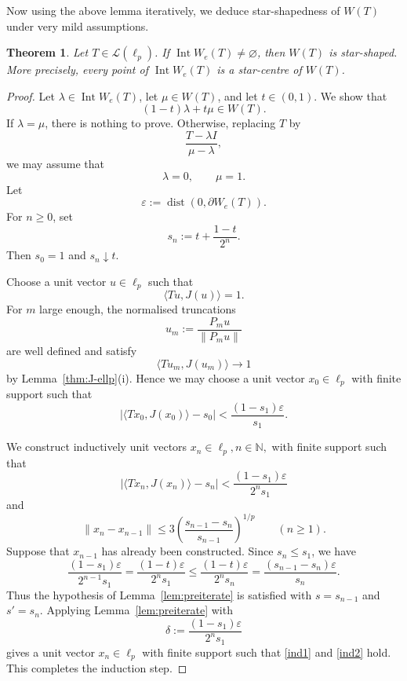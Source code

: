 \documentclass[11pt]{amsart}
\numberwithin{equation}{section}
\newtheorem{theorem}{Theorem}[section]
\theoremstyle{definition}
\theoremstyle{remark}
\DeclareMathOperator{\Int}{Int}
\newcommand{\We}{W_e}
\begin{document}
Now using the above lemma iteratively, we deduce star-shapedness of $W(T)$ under very mild assumptions. 



\begin{theorem}\label{thm:W-starshaped-when-intWe}
Let \(T\in\mathcal L(\ell_p)\). If $\Int \We(T)\ne \varnothing$, then $W(T)$ is star-shaped. More precisely, every point of $\Int \We(T)$ is a star-centre of $W(T)$.
\end{theorem}
\begin{proof}
Let \(\lambda\in \operatorname{Int}W_e(T)\), let \(\mu\in W(T)\), and let
\(t\in(0,1)\). We show that
\[
        (1-t)\lambda+t\mu\in W(T).
\]
If \(\lambda=\mu\), there is nothing to prove. Otherwise, replacing \(T\) by
\[
        \frac{T-\lambda I}{\mu-\lambda},
\]
we may assume that
\[
        \lambda=0,\qquad \mu=1.
\]
Let
\[
        \varepsilon:=\operatorname{dist}(0,\partial W_e(T)).
\]
For \(n\ge0\), set
\[
        s_n:=t+\frac{1-t}{2^n}.
\]
Then \(s_0=1\) and \(s_n\downarrow t\).

Choose a unit vector \(u\in\ell_p\) such that
\[
        \langle Tu,J(u)\rangle=1.
\]
For \(m\) large enough, the normalised truncations
\[
        u_m:=\frac{P_m u}{\|P_m u\|}
\]
are well defined and satisfy
\[
        \langle Tu_m,J(u_m)\rangle\to 1
\]
by Lemma~\ref{thm:J-ellp}(i). Hence we may choose a unit vector \(x_0\in\ell_p\) with
finite support such that
\[
        |\langle Tx_0,J(x_0)\rangle-s_0|
        <
        \frac{(1-s_1)\varepsilon}{s_1}.
\]

We construct inductively unit vectors \(x_n\in\ell_p, n \in \mathbb N,\) with finite support
such that
\begin{equation}\label{ind1}
        |\langle Tx_n,J(x_n)\rangle-s_n|
        <
        \frac{(1-s_1)\varepsilon}{2^n s_1}
\end{equation}
and
\begin{equation}\label{ind2}
        \|x_n-x_{n-1}\|
        \le
        3\left(\frac{s_{n-1}-s_n}{s_{n-1}}\right)^{1/p}
        \qquad (n\ge1).
\end{equation}
Suppose that \(x_{n-1}\) has already been constructed. Since \(s_n\le s_1\),
we have
\[
        \frac{(1-s_1)\varepsilon}{2^{n-1}s_1}
        =
        \frac{(1-t)\varepsilon}{2^n s_1}
        \le
        \frac{(1-t)\varepsilon}{2^n s_n}
        =
        \frac{(s_{n-1}-s_n)\varepsilon}{s_n}.
\]
Thus the hypothesis of Lemma~\ref{lem:preiterate} is satisfied with \(s=s_{n-1}\) and
\(s'=s_n\). Applying Lemma~\ref{lem:preiterate} with
\[
        \delta:=\frac{(1-s_1)\varepsilon}{2^n s_1}
\]
gives a unit vector \(x_n\in\ell_p\) with finite support such that
\eqref{ind1} and \eqref{ind2} hold.
This completes the induction step.


\end{proof}
\end{document}

